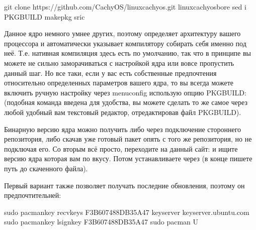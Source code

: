 \documentclass[letterpaper,10pt,russian,openany]{sphinxmanual}
\begin{document}
\begin{sphinxVerbatim}[commandchars=\\\{\}]
git clone https://github.com/CachyOS/linux\PYGZhy{}cachyos.git  
 linux\PYGZhy{}cachyos\PYGZhy{}bore 
sed \PYGZhy{}i  PKGBUILD 
makepkg \PYGZhy{}sric
\end{sphinxVerbatim}

\sphinxAtStartPar
Данное ядро немного умнее других, поэтому определяет архитектуру вашего процессора
и автоматически указывает компилятору собирать себя именно под неё. Т.е. нативная
компиляция здесь есть по умолчанию, так что в принципе вы можете не сильно заморачиваться
с настройкой ядра или вовсе пропустить данный шаг. Но все таки, если у вас есть собственные
предпочтения относительно определенных параметров вашего ядра, то вы всегда можете включить ручную настройку
через menuconfig использую опцию PKGBUILD: 
(подобная команда введена для удобства, вы можете сделать то же самое через любой удобный вам
текстовый редактор, отредактировав файл PKGBUILD).

\sphinxAtStartPar
{}

\sphinxAtStartPar
Бинарную версию ядра можно получить либо через подключение стороннего репозитория,
либо скачав уже готовый пакет опять с того же репозитория, но не подключая его.
Со вторым всё просто, переходите на данный сайт:  и ищите
версию ядра которая вам по вкусу. Потом устанавливаете через  (в конце пишете путь до скаченного файла).

\sphinxAtStartPar
Первый вариант также позволяет получать последние обновления, поэтому он предпочтительней:

\begin{sphinxVerbatim}[commandchars=\\\{\}]
sudo pacman\PYGZhy{}key \PYGZhy{}\PYGZhy{}recv\PYGZhy{}keys F3B607488DB35A47 \PYGZhy{}\PYGZhy{}keyserver keyserver.ubuntu.com
sudo pacman\PYGZhy{}key \PYGZhy{}\PYGZhy{}lsign\PYGZhy{}key F3B607488DB35A47
sudo pacman \PYGZhy{}U   
\end{sphinxVerbatim}
\end{document}
